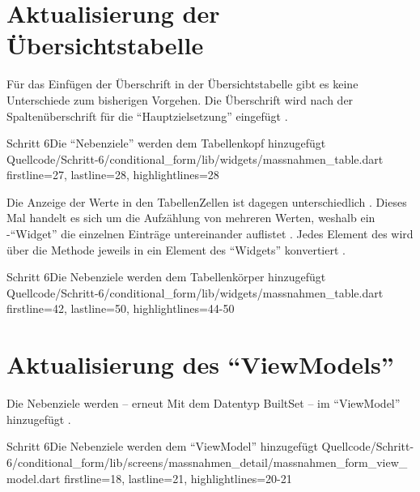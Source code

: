 \section{Aktualisierung der Übersichtstabelle}

Für das Einfügen der Überschrift in der Übersichtstabelle gibt es keine Unterschiede zum bisherigen Vorgehen.
Die Überschrift wird nach der Spaltenüberschrift für die \enquote{Hauptzielsetzung} eingefügt .

\begin{alexlisting}{Schritt 6}{Die \enquote{Nebenziele} werden dem Tabellenkopf hinzugefügt}
  {Quellcode/Schritt-6/conditional_form/lib/widgets/massnahmen_table.dart}
  {firstline=27, lastline=28, highlightlines={28}}
  \label{lst:Schritt6buildColumnHeader}
\end{alexlisting}

Die Anzeige der Werte in den TabellenZellen ist dagegen unterschiedlich \Lst{\ref{lst:Schritt6buildSelectableCell}}.
Dieses Mal handelt es sich um die Aufzählung von mehreren Werten,
weshalb ein -\enquote{Widget} die einzelnen Einträge untereinander auflistet .
Jedes Element des    wird über die Methode  jeweils in ein Element des \enquote{Widgets}  konvertiert .

\begin{alexlisting}{Schritt 6}{Die Nebenziele werden dem Tabellenkörper hinzugefügt}
  {Quellcode/Schritt-6/conditional_form/lib/widgets/massnahmen_table.dart}
  {firstline=42, lastline=50, highlightlines={44-50}}
  \label{lst:Schritt6buildSelectableCell}
\end{alexlisting}

\section{Aktualisierung des \enquote{ViewModels}}

Die Nebenziele werden -- erneut Mit dem Datentyp BuiltSet -- im \enquote{ViewModel} hinzugefügt \Lst{\ref{lst:Schritt6BehaviorSubjectNebenziele}}.
\begin{alexlisting}{Schritt 6}{Die Nebenziele werden dem \enquote{ViewModel} hinzugefügt}
  {Quellcode/Schritt-6/conditional_form/lib/screens/massnahmen_detail/massnahmen_form_view_model.dart}
  {firstline=18, lastline=21, highlightlines={20-21}}
  \label{lst:Schritt6BehaviorSubjectNebenziele}
\end{alexlisting}


